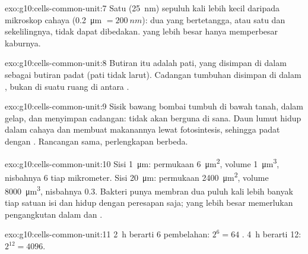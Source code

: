 \begin{solution}{exo:g10:cells-common-unit:7}
Satu  (\qty{25}{nm}) sepuluh kali lebih kecil daripada  mikroskop cahaya (\qty{0.2}{\micro m} $= \qty{200}{nm}$): dua
 yang bertetangga, atau satu  dan sekelilingnya, tidak
dapat dibedakan.  yang lebih besar hanya memperbesar kaburnya.
\end{solution}

\begin{solution}{exo:g10:cells-common-unit:8}
Butiran itu adalah pati, yang disimpan di dalam  sebagai butiran
padat (pati tidak larut). Cadangan tumbuhan disimpan di dalam ,
bukan di suatu ruang di antara .
\end{solution}

\begin{solution}{exo:g10:cells-common-unit:9}
Sisik bawang bombai tumbuh di bawah tanah, dalam gelap, dan menyimpan
cadangan:  tidak akan berguna di sana. Daun lumut hidup dalam
cahaya dan membuat makanannya lewat fotosintesis, sehingga  padat
dengan . Rancangan sama, perlengkapan berbeda.
\end{solution}

\begin{solution}{exo:g10:cells-common-unit:10}
Sisi \qty{1}{\micro m}: permukaan \qty{6}{\micro m^2}, volume
\qty{1}{\micro m^3}, nisbahnya 6 tiap mikrometer. Sisi \qty{20}{\micro m}:
permukaan \qty{2400}{\micro m^2}, volume \qty{8000}{\micro m^3},
nisbahnya 0.3. Bakteri punya membran dua puluh kali lebih banyak tiap
satuan isi dan hidup dengan peresapan saja;  yang lebih besar
memerlukan pengangkutan dalam dan .
\end{solution}

\begin{solution}{exo:g10:cells-common-unit:11}
\qty{2}{h} berarti 6 pembelahan: $2^6 = 64$ . \qty{4}{h} berarti 12:
$2^{12} = 4096$.
\end{solution}

